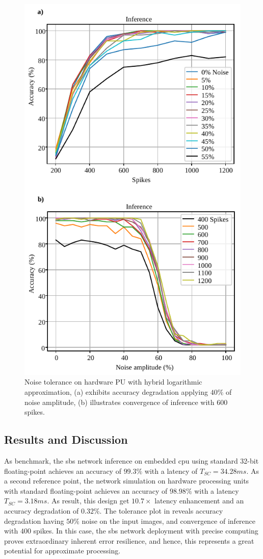 \begin{figure}[b!]
	\centering
	\includegraphics[width=0.5\columnwidth]{./chapters/sbs_accelerator/figures/accuracy_vs_noise_pu_log.pdf}
	\caption{Noise tolerance on hardware PU with hybrid logarithmic approximation, (a) exhibits accuracy degradation applying $40\%$ of noise amplitude, (b) illustrates convergence of inference with $600$ spikes.}
	\label{fig:accuracy_vs_noise_pu_log}
\end{figure}


\subsection{Results and Discussion}
As benchmark, the \gls{sbs} network inference on embedded \gls{cpu} using standard 32-bit floating-point achieves an accuracy of $99.3\%$ with a latency of $T_{SC} = 34.28 ms$. As a second reference point, the network simulation on hardware processing units with standard floating-point achieves an accuracy of $98.98\%$ with a latency $T_{SC}=3.18 ms$. As result, this design get $10.7\times$ latency enhancement and an accuracy degradation of $0.32\%$. The tolerance plot in  reveals accuracy degradation having $50\%$ noise on the input images, and convergence of inference with $400$ spikes. In this case, the \gls{sbs} network deployment with precise computing proves extraordinary inherent error resilience, and hence, this represents a great potential for approximate processing.

